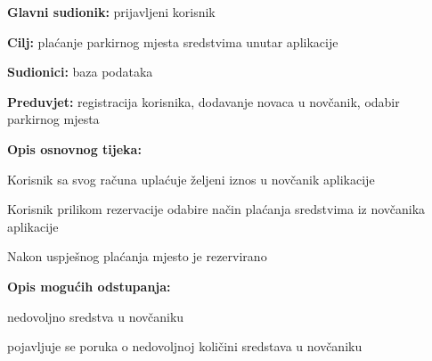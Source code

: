 					\noindent {}
					\begin{packed_item}
						
						\item \textbf{Glavni sudionik: }prijavljeni korisnik
						\item  \textbf{Cilj:} plaćanje parkirnog mjesta sredstvima unutar aplikacije
						\item  \textbf{Sudionici:} baza podataka
						\item  \textbf{Preduvjet:} registracija korisnika, dodavanje novaca u novčanik, odabir parkirnog mjesta
						\item  \textbf{Opis osnovnog tijeka:}
						
						\item[] \begin{packed_enum}
							
							\item  Korisnik sa svog računa uplaćuje željeni iznos u novčanik aplikacije
							\item Korisnik prilikom rezervacije odabire način plaćanja sredstvima iz novčanika aplikacije
							\item  Nakon uspješnog plaćanja mjesto je rezervirano
						\end{packed_enum}
						
						\item  \textbf{Opis mogućih odstupanja:}
						
						\item[] \begin{packed_item}
							
							\item[2.a] nedovoljno sredstva u novčaniku
							\item[] \begin{packed_enum}
								
								\item pojavljuje se poruka o nedovoljnoj količini sredstava u novčaniku
								
							\end{packed_enum}

							
						\end{packed_item}
					\end{packed_item}
					
